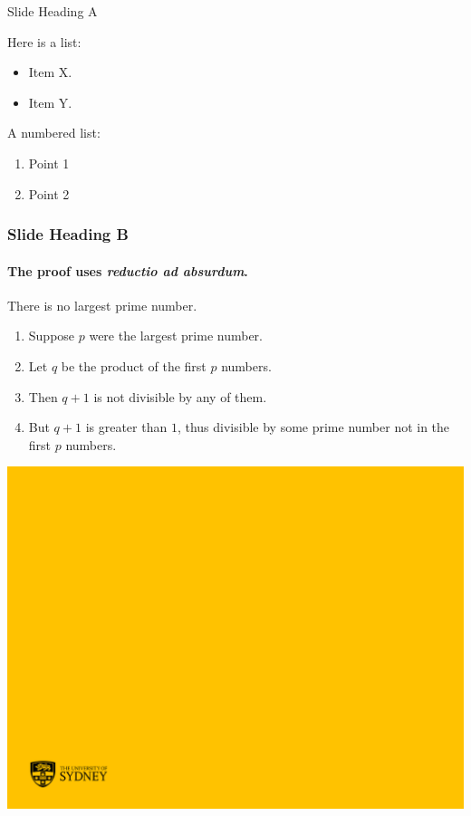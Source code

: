 \documentclass{beamer}
\begin{document}
\begin{frame}{Slide Heading A}

Here is a list:
\begin{itemize}
\item Item X.
\item Item Y.
\end{itemize}

\bigskip

A numbered list:
\begin{enumerate}
\item Point 1
\item Point 2
\end{enumerate}

\end{frame}


\begin{frame} 
\frametitle{Slide Heading B} 
\framesubtitle{The proof uses \textit{reductio ad absurdum}.} 

\begin{theorem}
There is no largest prime number. \end{theorem} 
\begin{enumerate} 
\item<1-| alert@1> Suppose $p$ were the largest prime number. 
\item<2-> Let $q$ be the product of the first $p$ numbers. 
\item<3-> Then $q+1$ is not divisible by any of them. 
\item<1-> But $q + 1$ is greater than $1$, thus divisible by some prime
number not in the first $p$ numbers.
\end{enumerate}

\end{frame}


{\includegraphics[width=\paperwidth,height=\paperheight]{sectiondivstd3jun16.pdf}}
\end{document}
